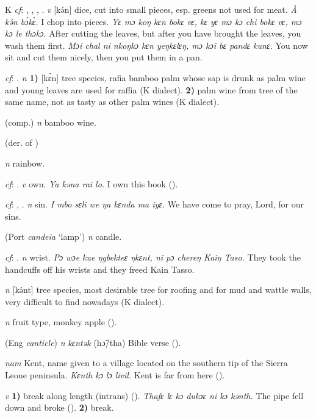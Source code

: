 \begin{letter}{K}
 \textit{cf}: , , , . \textit{v} [kə́n] dice, cut into small pieces, esp. greens not used for meat. \textit{À kə́n bɔ́kɛ̀.} I chop into pieces. \textit{Yɛ mɔ koŋ kɛn bokɛ vɛ, kɛ yɛ mɔ kɔ chi bokɛ vɛ, mɔ kɔ le thɔkɔ.} After cutting the leaves, but after you have brought the leaves, you wash them first. \textit{Mɔi chal ni nkoŋkɔ kɛn yeŋkɛlɛŋ, mɔ kɔi bɛ pandɛ kunɛ.} You now sit and cut them nicely, then you put them in a pan.

 \textit{cf}: . \textit{n} \textbf{1)} [kɛ̀n] tree species, rafia bamboo palm whose sap is drunk as palm wine and young leaves are used for raffia (K dialect). \textbf{2)} palm wine from tree of the same name, not as tasty as other palm wines (K dialect). 

 (comp.) \textit{n} bamboo wine.

 (der. of ) 

 \textit{n} rainbow.

 \textit{cf}: . \textit{v} own. \textit{Ya kəna rai lo.} I own this book (\citealt{Pichl1967}). 

 \textit{cf}: , . \textit{n} sin. \textit{I mbo sɛli we ŋa kɛnda ma iyɛ.} We have come to pray, Lord, for our sins.

 (Port \textit{candeia} ‘lamp') \textit{n} candle.

 \textit{cf}: . \textit{n} wrist. \textit{Pɔ wɔe kue ŋgbekteɛ ŋkɛnt, ni pɔ chereŋ Kaiŋ Taso.} They took the handcuffs off his wrists and they freed Kain Tasso.

 \textit{n} [kǝ́nt] tree species, most desirable tree for roofing and for mud and wattle walls, very difficult to find nowadays (K dialect). 

 \textit{n} fruit type, monkey apple (\citealt{Pichl1967}). 

 (Eng \textit{canticle}) \textit{n} \textit{kɛntək} (hɔ̃/tha) Bible verse (\citealt{Pichl1967}). 

 \textit{nam} Kent, name given to a village located on the southern tip of the Sierra Leone peninsula. \textit{Kɛnth kɔ lɔ livil.} Kent is far from here (\citealt{Pichl1967}). 

 \textit{v} \textbf{1)} break along length (intrans) (\citealt{Sumner1921}). \textit{Thafɛ lɛ kɔ dukɔɛ ni kɔ kənth.} The pipe fell down and broke (\citealt{Pichl1967}). \textbf{2)} break.


\end{letter}
